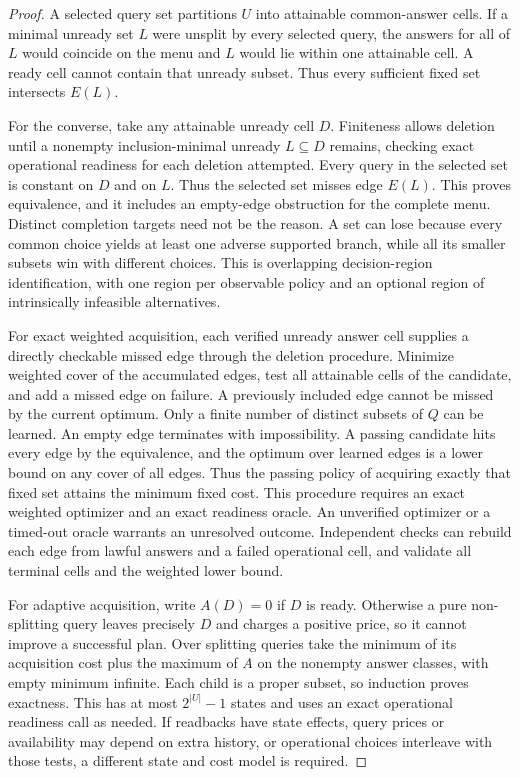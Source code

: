 \begin{proof}
A selected query set partitions \(U\) into attainable common-answer cells. If a minimal unready set \(L\) were unsplit by every selected query, the answers for all of \(L\) would coincide on the menu and \(L\) would lie within one attainable cell. A ready cell cannot contain that unready subset. Thus every sufficient fixed set intersects \(E(L)\).

For the converse, take any attainable unready cell \(D\). Finiteness allows deletion until a nonempty inclusion-minimal unready \(L\subseteq D\) remains, checking exact operational readiness for each deletion attempted. Every query in the selected set is constant on \(D\) and on \(L\). Thus the selected set misses edge \(E(L)\). This proves equivalence, and it includes an empty-edge obstruction for the complete menu. Distinct completion targets need not be the reason. A set can lose because every common choice yields at least one adverse supported branch, while all its smaller subsets win with different choices. This is overlapping decision-region identification, with one region per observable policy and an optional region of intrinsically infeasible alternatives.

For exact weighted acquisition, each verified unready answer cell supplies a directly checkable missed edge through the deletion procedure. Minimize weighted cover of the accumulated edges, test all attainable cells of the candidate, and add a missed edge on failure. A previously included edge cannot be missed by the current optimum. Only a finite number of distinct subsets of \(Q\) can be learned. An empty edge terminates with impossibility. A passing candidate hits every edge by the equivalence, and the optimum over learned edges is a lower bound on any cover of all edges. Thus the passing policy of acquiring exactly that fixed set attains the minimum fixed cost. This procedure requires an exact weighted optimizer and an exact readiness oracle. An unverified optimizer or a timed-out oracle warrants an unresolved outcome. Independent checks can rebuild each edge from lawful answers and a failed operational cell, and validate all terminal cells and the weighted lower bound.

For adaptive acquisition, write \(A(D)=0\) if \(D\) is ready. Otherwise a pure non-splitting query leaves precisely \(D\) and charges a positive price, so it cannot improve a successful plan. Over splitting queries take the minimum of its acquisition cost plus the maximum of \(A\) on the nonempty answer classes, with empty minimum infinite. Each child is a proper subset, so induction proves exactness. This has at most \(2^{|U|}-1\) states and uses an exact operational readiness call as needed. If readbacks have state effects, query prices or availability may depend on extra history, or operational choices interleave with those tests, a different state and cost model is required.


\end{proof}
